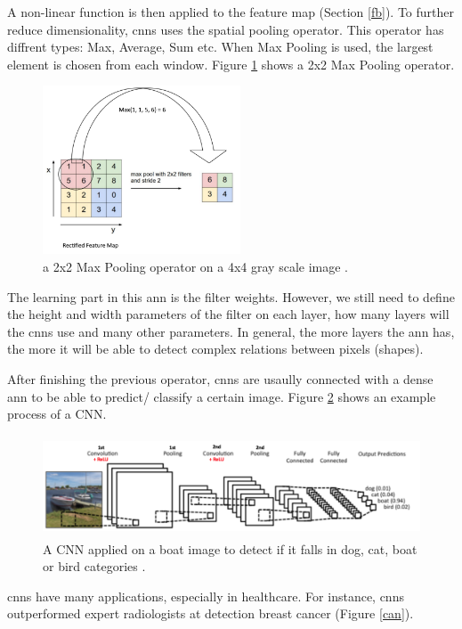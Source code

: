 \documentclass[runningheads]{llncs}
\begin{document}
A non-linear function is then applied to the feature map (Section \ref{fb}).
To further reduce dimensionality, \gls{cnns} uses the spatial pooling operator.
This operator has diffrent types: Max, Average, Sum etc. 
When Max Pooling is used, the largest element is chosen from each window.
Figure \ref{mp} shows a 2x2 Max Pooling operator.


\begin{figure}[H]
    \label{mp}
    \centering
    \includegraphics[height=5cm]{max_pool}
    \caption{a 2x2 Max Pooling operator on a 4x4 gray scale image \cite{maxpool}.}
\end{figure}

The learning part in this \gls{ann} is the filter weights. However, we 
still need to define the height and width parameters of the filter on each layer, how
many layers will the \gls{cnns} use and many other parameters. In general, 
the more layers the \gls{ann} has, the more it will be able to detect complex 
relations between pixels (shapes).

After finishing the previous operator, \gls{cnns} are usaully connected with 
a dense \gls{ann} to be able to predict/ classify a certain image. Figure \ref{dcnnp} 
shows an example process of a CNN.

\begin{figure}[H]
    \label{dcnnp}
    \centering
    \includegraphics[height=3cm]{dcnnp}
    \caption{A CNN applied on a boat image to detect if it falls in 
    dog, cat, boat or bird categories \cite{cnnpro}.}
\end{figure}

\gls{cnns} have many applications, especially in healthcare. For instance, 
\gls{cnns} outperformed expert radiologists at detection breast cancer \cite{mckinney2020international} (Figure \ref{can}).
\end{document}
